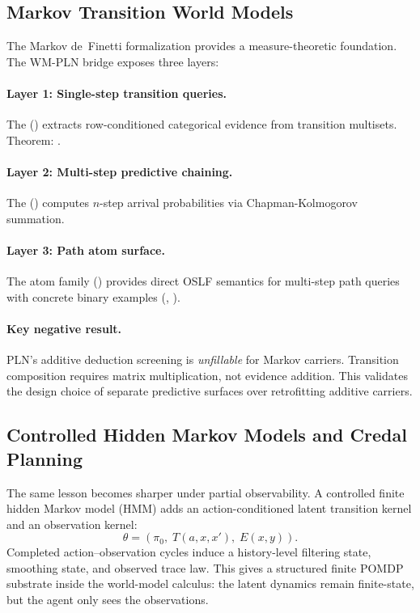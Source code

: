 \documentclass[11pt,openany]{report}
\begin{document}
\subsection{Markov Transition World Models}

The Markov de~Finetti formalization provides a measure-theoretic foundation.
The WM-PLN bridge exposes three layers:

\paragraph{Layer 1: Single-step transition queries.}
The  ()
extracts row-conditioned categorical evidence from transition multisets.
Theorem: .

\paragraph{Layer 2: Multi-step predictive chaining.}
The  ()
computes $n$-step arrival probabilities via Chapman-Kolmogorov summation.

\paragraph{Layer 3: Path atom surface.}
The  atom family ()
provides direct OSLF semantics for multi-step path queries with concrete
binary examples (, ).

\paragraph{Key negative result.} PLN's additive deduction screening is
\emph{unfillable} for Markov carriers. Transition composition requires
matrix multiplication, not evidence addition. This validates the design
choice of separate predictive surfaces over retrofitting additive carriers.

\subsection{Controlled Hidden Markov Models and Credal Planning}

The same lesson becomes sharper under partial observability.  A
controlled finite hidden Markov model (HMM) adds an action-conditioned
latent transition kernel and an observation kernel:
\[
  \theta = (\pi_0,\; T(a,x,x'),\; E(x,y)).
\]
Completed action--observation cycles induce a history-level filtering
state, smoothing state, and observed trace law.  This gives a
structured finite POMDP substrate inside the world-model calculus: the
latent dynamics remain finite-state, but the agent only sees the
observations.
\end{document}

